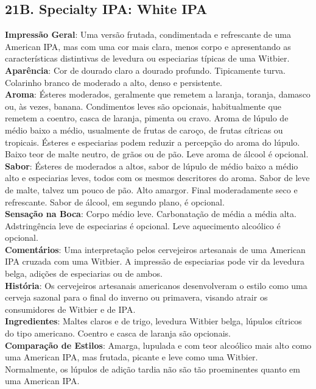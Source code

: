 \subsection*{21B. Specialty IPA: White IPA}
\textbf{Impressão Geral}: Uma versão frutada, condimentada e refrescante de uma American IPA, mas com uma cor mais clara, menos corpo e apresentando as características distintivas de levedura ou especiarias típicas de uma Witbier. \\
\textbf{Aparência}: Cor de dourado claro a dourado profundo. Tipicamente turva. Colarinho branco de moderado a alto, denso e persistente. \\
\textbf{Aroma}: Ésteres moderados, geralmente que remetem a laranja, toranja, damasco ou, às vezes, banana. Condimentos leves são opcionais, habitualmente que remetem a coentro, casca de laranja, pimenta ou cravo. Aroma de lúpulo de médio baixo a médio, usualmente de frutas de caroço, de frutas cítricas ou tropicais. Ésteres e especiarias podem reduzir a percepção do aroma do lúpulo. Baixo teor de malte neutro, de grãos ou de pão. Leve aroma de álcool é opcional. \\
\textbf{Sabor}: Ésteres de moderados a altos, sabor de lúpulo de médio baixo a médio alto e especiarias leves, todos com os mesmos descritores do aroma. Sabor de leve de malte, talvez um pouco de pão. Alto amargor. Final moderadamente seco e refrescante. Sabor de álcool, em segundo plano, é opcional. \\
\textbf{Sensação na Boca}: Corpo médio leve. Carbonatação de média a média alta. Adstringência leve de especiarias é opcional. Leve aquecimento alcoólico é opcional. \\
\textbf{Comentários}: Uma interpretação pelos cervejeiros artesanais de uma American IPA cruzada com uma Witbier. A impressão de especiarias pode vir da levedura belga, adições de especiarias ou de ambos. \\
\textbf{História}: Os cervejeiros artesanais americanos desenvolveram o estilo como uma cerveja sazonal para o final do inverno ou primavera, visando atrair os consumidores de Witbier e de IPA. \\
\textbf{Ingredientes}: Maltes claros e de trigo, levedura Witbier belga, lúpulos cítricos do tipo americano. Coentro e casca de laranja são opcionais. \\
\textbf{Comparação de Estilos}: Amarga, lupulada e com teor alcoólico mais alto como uma American IPA, mas frutada, picante e leve como uma Witbier. Normalmente, os lúpulos de adição tardia não são tão proeminentes quanto em uma American IPA. \\
